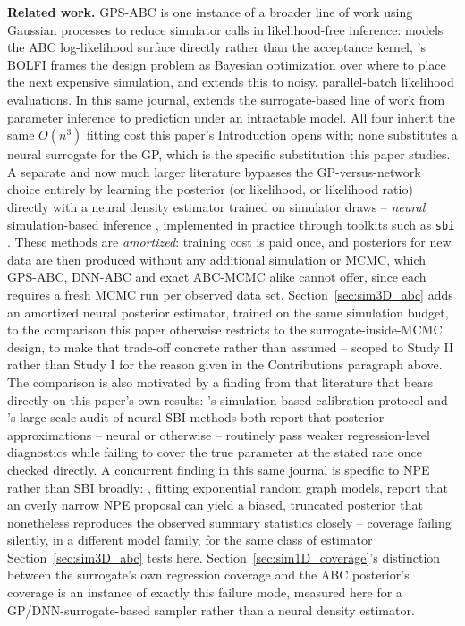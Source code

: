 \documentclass[sn-basic,iicol,pdflatex]{sn-jnl}
\begin{document}
\noindent\textbf{Related work.} GPS-ABC \citep{meeds2014} is one instance of a
broader line of work using Gaussian processes to reduce simulator calls in
likelihood-free inference: \citet{wilkinson2014} models the ABC log-likelihood
surface directly rather than the acceptance kernel, \citet{gutmann2016}'s BOLFI
frames the design problem as Bayesian optimization over where to place the next
expensive simulation, and \citet{jarvenpaa2021} extends this to noisy,
parallel-batch likelihood evaluations. In this same journal, \citet{jarvenpaa2023}
extends the surrogate-based line of work from parameter inference to
prediction under an intractable model. All four inherit the same $O(n^3)$
fitting cost this paper's Introduction opens with; none substitutes a neural
surrogate for the GP, which is the specific substitution this paper studies. A
separate and now much larger literature bypasses the GP-versus-network choice
entirely by learning the posterior (or likelihood, or likelihood ratio)
directly with a neural density estimator trained on simulator draws --
\emph{neural} simulation-based inference
\citep{papamakarios2016,greenberg2019,cranmer2020}, implemented in
practice through toolkits such as \texttt{sbi} \citep{tejerocantero2020}. These
methods are \emph{amortized}: training cost is paid once, and posteriors for
new data are then produced without any additional simulation or MCMC, which
GPS-ABC, DNN-ABC and exact ABC-MCMC alike cannot offer, since each requires a
fresh MCMC run per observed data set. Section~\ref{sec:sim3D_abc} adds an
amortized neural posterior estimator, trained on the same simulation budget,
to the comparison this paper otherwise restricts to the surrogate-inside-MCMC
design, to make that trade-off concrete rather than assumed -- scoped to
Study II rather than Study I for the reason given in the Contributions
paragraph above. The comparison is also motivated by a finding from that literature that bears directly on this
paper's own results: \citet{talts2018}'s simulation-based calibration protocol
and \citet{hermans2022}'s large-scale audit of neural SBI methods both report
that posterior approximations -- neural or otherwise -- routinely pass
weaker regression-level diagnostics while failing to cover the true parameter
at the stated rate once checked directly. A concurrent finding in this same
journal is specific to NPE rather than SBI broadly: \citet{fanwhite2026},
fitting exponential random graph models, report that an overly narrow NPE
proposal can yield a biased, truncated posterior that nonetheless reproduces
the observed summary statistics closely -- coverage failing silently, in a
different model family, for the same class of estimator Section~\ref{sec:sim3D_abc}
tests here. Section~\ref{sec:sim1D_coverage}'s
distinction between the surrogate's own regression coverage and the ABC
posterior's coverage is an instance of exactly this failure mode, measured
here for a GP/DNN-surrogate-based sampler rather than a neural density
estimator.
\end{document}
